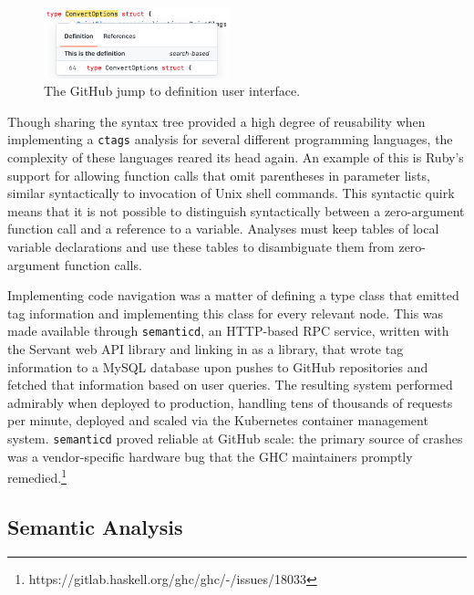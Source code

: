 \documentclass[acmsmall,fleqn,12pt]{acmart}
\begin{document}
\begin{figure}
  \begin{center}
    \includegraphics[width=0.48\textwidth]{code-nav-screenshot.png}
  \end{center}
  \caption{The GitHub jump to definition user interface.}
  \label{fig:CodeNavScreenshot}
\end{figure}

Though sharing the syntax tree provided a high degree of reusability when
implementing a \texttt{ctags} analysis for several different programming
languages, the complexity of these languages reared its head again. An example
of this is Ruby’s support for allowing function calls that omit parentheses in
parameter lists, similar syntactically to invocation of Unix shell commands.
This syntactic quirk means that it is not possible to distinguish syntactically
between a zero-argument function call and a reference to a variable. Analyses
must keep tables of local variable declarations and use these tables to
disambiguate them from zero-argument function calls.

Implementing code navigation was a matter of defining a type class that emitted
tag information and implementing this class for every relevant node. This was
made available through \texttt{semanticd}, an HTTP-based RPC service, written
with the Servant web API library \cite{servant14} and linking in \semantic{} as
a library, that wrote tag information to a MySQL database upon pushes to GitHub
repositories and fetched that information based on user queries. The resulting
system performed admirably when deployed to production, handling tens of
thousands of requests per minute, deployed and scaled via the Kubernetes
\cite{google14kube} container management system. \texttt{semanticd} proved
reliable at GitHub scale: the primary source of crashes was a vendor-specific
hardware bug that the GHC maintainers promptly
remedied.\footnote{https://gitlab.haskell.org/ghc/ghc/-/issues/18033}

\subsection{Semantic Analysis}
\end{document}
